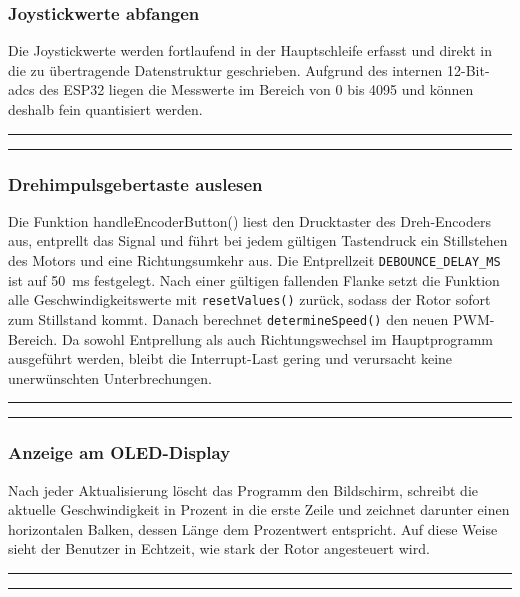 \documentclass[a4paper,12pt]{article}
\begin{document}
\subsubsection{Joystickwerte abfangen}

Die Joystickwerte werden fortlaufend in der Hauptschleife erfasst und direkt in die zu übertragende Datenstruktur geschrieben. Aufgrund des internen 12-Bit-\gls{adc}s des ESP32 liegen die Messwerte im Bereich von 0 bis 4095 und können deshalb fein quantisiert werden.
\newline\noindent\rule{\linewidth}{0.4pt}  %

\noindent\rule{\linewidth}{0.4pt}  %



\subsubsection{Drehimpulsgebertaste auslesen}

Die Funktion handleEncoderButton() liest den Drucktaster des Dreh-Encoders aus, entprellt das Signal und führt bei jedem gültigen Tastendruck ein Stillstehen des Motors und eine Richtungsumkehr aus. Die Entprellzeit \texttt{DEBOUNCE\_DELAY\_MS} ist auf \SI{50}{\milli\second} festgelegt. Nach einer gültigen fallenden Flanke setzt die Funktion alle Geschwindigkeitswerte mit \texttt{resetValues()} zurück, sodass der Rotor sofort zum Stillstand kommt. Danach berechnet \texttt{determineSpeed()} den neuen PWM-Bereich. Da sowohl Entprellung als auch Richtungswechsel im Hauptprogramm ausgeführt werden, bleibt die Interrupt-Last gering und verursacht keine unerwünschten Unterbrechungen.


\noindent\rule{\linewidth}{0.4pt}  %

\noindent\rule{\linewidth}{0.4pt}  %


\subsubsection{Anzeige am OLED-Display}
Nach jeder Aktualisierung löscht das Programm den Bildschirm, schreibt die aktuelle Geschwindigkeit in Prozent in die erste Zeile und zeichnet darunter einen horizontalen Balken, dessen Länge dem Prozentwert entspricht. Auf diese Weise sieht der Benutzer in Echtzeit, wie stark der Rotor angesteuert wird. 
\newline\noindent\rule{\linewidth}{0.4pt}  %

\noindent\rule{\linewidth}{0.4pt}  %
\end{document}
